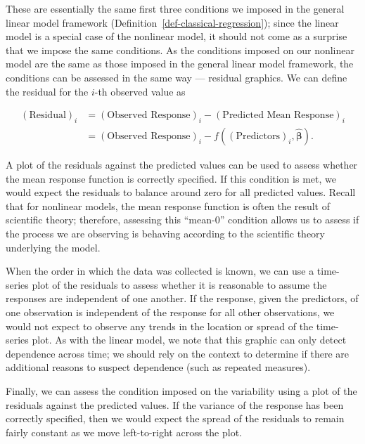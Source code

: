 \documentclass[
  letterpaper,
  DIV=11,
  numbers=noendperiod]{scrreprt}
\theoremstyle{definition}
\theoremstyle{definition}
\theoremstyle{remark}
\begin{document}
These are essentially the same first three conditions we imposed in the
general linear model framework
(Definition~\ref{def-classical-regression}); since the linear model is a
special case of the nonlinear model, it should not come as a surprise
that we impose the same conditions. As the conditions imposed on our
nonlinear model are the same as those imposed in the general linear
model framework, the conditions can be assessed in the same way ---
residual graphics. We can define the residual for the \(i\)-th observed
value as

\[
\begin{aligned}
  (\text{Residual})_i &= (\text{Observed Response})_i - (\text{Predicted Mean Response})_i \\
    &= (\text{Observed Response})_i - f\left((\text{Predictors})_i, \widehat{\boldsymbol{\beta}}\right).
\end{aligned}
\]

A plot of the residuals against the predicted values can be used to
assess whether the mean response function is correctly specified. If
this condition is met, we would expect the residuals to balance around
zero for all predicted values. Recall that for nonlinear models, the
mean response function is often the result of scientific theory;
therefore, assessing this ``mean-0'' condition allows us to assess if
the process we are observing is behaving according to the scientific
theory underlying the model.

When the order in which the data was collected is known, we can use a
time-series plot of the residuals to assess whether it is reasonable to
assume the responses are independent of one another. If the response,
given the predictors, of one observation is independent of the response
for all other observations, we would not expect to observe any trends in
the location or spread of the time-series plot. As with the linear
model, we note that this graphic can only detect dependence across time;
we should rely on the context to determine if there are additional
reasons to suspect dependence (such as repeated measures).

Finally, we can assess the condition imposed on the variability using a
plot of the residuals against the predicted values. If the variance of
the response has been correctly specified, then we would expect the
spread of the residuals to remain fairly constant as we move
left-to-right across the plot.
\end{document}
